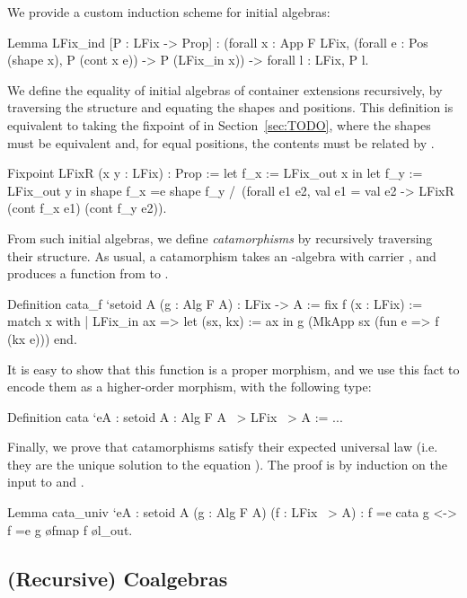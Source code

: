 \documentclass[anonymous, a4paper, UKenglish, cleveref, autoref, thm-restate]{lipics-v2021}
\begin{document}
We provide a custom induction scheme for initial algebras:
\begin{coqcode}
Lemma LFix_ind [P : LFix -> Prop]
  : (forall x : App F LFix,
        (forall e : Pos (shape x), P (cont x e)) ->
        P (LFix_in x))
    -> forall l : LFix, P l.
\end{coqcode}
We define the equality of initial algebras of container extensions recursively,
by traversing the structure and equating the shapes and positions. This
definition is equivalent to taking the fixpoint of  in
Section~\ref{sec:TODO}, where the shapes must be equivalent and, for equal
positions, the contents must be related by .
\begin{coqcode}
Fixpoint LFixR (x y : LFix) : Prop :=
  let f_x := LFix_out x in
  let f_y := LFix_out y in
  shape f_x =e shape f_y /\
    (forall e1 e2, val e1 = val e2 -> LFixR (cont f_x e1) (cont f_y e2)).
\end{coqcode}
From such initial algebras, we define \emph{catamorphisms} by recursively
traversing their structure. As usual, a catamorphism takes an
-algebra with carrier , and produces a
function from  to \coq{A}.
\begin{coqcode}
Definition cata_f `{setoid A} (g : Alg F A) : LFix -> A
:= fix f (x : LFix) :=
  match x with
  | LFix_in ax =>
      let (sx, kx) := ax in
      g (MkApp sx (fun e => f (kx e)))
  end.
\end{coqcode}
It is easy to show that this function is a proper morphism, and we use this
fact to encode them as a higher-order morphism, with the following type:
\begin{coqcode}
Definition cata `{eA : setoid A} : Alg F A ~> LFix ~> A := ...
\end{coqcode}
Finally, we prove that catamorphisms satisfy their expected universal law (i.e.
they are the unique solution to the equation \coq{f =e g \o fmap f \o l_out}).
The proof is by induction on the input to \coq{f} and
.
\begin{coqcode}
Lemma cata_univ `{eA : setoid A} (g : Alg F A) (f : LFix ~> A)
    : f =e cata g <-> f =e g \o fmap f \o l_out.
\end{coqcode}

\subsection{(Recursive) Coalgebras}
\end{document}
